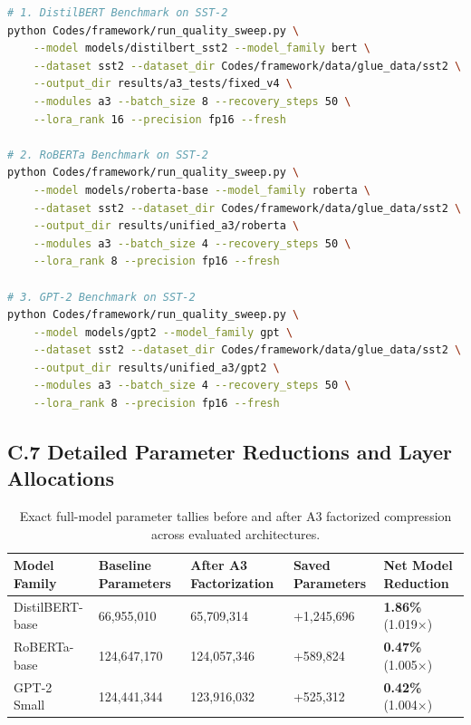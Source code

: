 \begin{lstlisting}[language=bash]
# 1. DistilBERT Benchmark on SST-2
python Codes/framework/run_quality_sweep.py \
    --model models/distilbert_sst2 --model_family bert \
    --dataset sst2 --dataset_dir Codes/framework/data/glue_data/sst2 \
    --output_dir results/a3_tests/fixed_v4 \
    --modules a3 --batch_size 8 --recovery_steps 50 \
    --lora_rank 16 --precision fp16 --fresh

# 2. RoBERTa Benchmark on SST-2
python Codes/framework/run_quality_sweep.py \
    --model models/roberta-base --model_family roberta \
    --dataset sst2 --dataset_dir Codes/framework/data/glue_data/sst2 \
    --output_dir results/unified_a3/roberta \
    --modules a3 --batch_size 4 --recovery_steps 50 \
    --lora_rank 8 --precision fp16 --fresh

# 3. GPT-2 Benchmark on SST-2
python Codes/framework/run_quality_sweep.py \
    --model models/gpt2 --model_family gpt \
    --dataset sst2 --dataset_dir Codes/framework/data/glue_data/sst2 \
    --output_dir results/unified_a3/gpt2 \
    --modules a3 --batch_size 4 --recovery_steps 50 \
    --lora_rank 8 --precision fp16 --fresh
\end{lstlisting}

\subsection{C.7 Detailed Parameter Reductions and Layer Allocations}
\label{sec:app_full_parameters}

\begin{table}[H]
\centering
\small
\begin{tabular}{lllll}
\toprule
\textbf{Model Family} & \textbf{Baseline Parameters} & \textbf{After A3 Factorization} & \textbf{Saved Parameters} & \textbf{Net Model Reduction} \\
\midrule
DistilBERT-base & 66,955,010 & 65,709,314 & +1,245,696 & \textbf{1.86\%} (1.019$\times$) \\
RoBERTa-base    & 124,647,170 & 124,057,346 & +589,824 & \textbf{0.47\%} (1.005$\times$) \\
GPT-2 Small     & 124,441,344 & 123,916,032 & +525,312 & \textbf{0.42\%} (1.004$\times$) \\
\bottomrule
\end{tabular}
\caption{Exact full-model parameter tallies before and after A3 factorized compression across evaluated architectures.}
\label{tab:app_full_param_counts}
\end{table}

